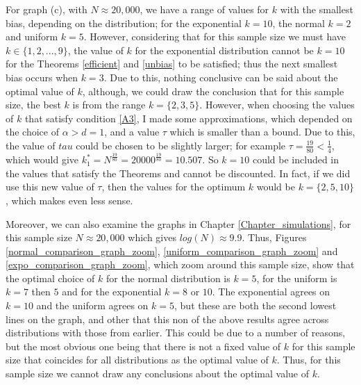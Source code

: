 \documentclass[12pt]{report}
\begin{document}
For graph (c), with $N \approx 20,000$, we have a range of values for $k$ with the smallest bias, depending on the distribution; for the exponential $k=10$, the normal $k=2$ and uniform $k=5$. However, considering that for this sample size we must have $k \in \{1, 2, ..., 9\}$, the value of $k$ for the exponential distribution cannot be $k=10$ for the Theorems \ref{efficient} and \ref{unbias} to be satisfied; thus the next smallest bias occurs when $k=3$. Due to this, nothing conclusive can be said about the optimal value of $k$, although, we could draw the conclusion that for this sample size, the best $k$ is from the range $k = \{2, 3, 5\}$. However, when choosing the values of $k$ that satisfy condition \ref{A3}, I made some approximations, which depended on the choice of $\alpha > d = 1$, and a value $\tau$ which is smaller than a bound. Due to this, the value of $tau$ could be chosen to be slightly larger; for example $\tau = \frac{19}{80} < \frac{1}{4}$, which would give $k_{1}^{*} = N^{\frac{19}{80}} = 20000^{\frac{19}{80}} = 10.507$. So $k=10$ could be included in the values that satisfy the Theorems and cannot be discounted. In fact, if we did use this new value of $\tau$, then the values for the optimum $k$ would be $k = \{2, 5, 10\}$, which makes even less sense.

Moreover, we can also examine the graphs in Chapter \ref{Chapter_simulations}, for this sample size $N \approx 20,000$ which gives $log(N) \approx 9.9$. Thus, Figures \ref{normal_comparison_graph_zoom}, \ref{uniform_comparison_graph_zoom} and \ref{expo_comparison_graph_zoom}, which zoom around this sample size, show that the optimal choice of $k$ for the normal distribution is $k=5$, for the uniform is $k=7$ then $5$ and for the exponential $k=8$ or $10$. The exponential agrees on $k=10$ and the uniform agrees on $k=5$, but these are both the second lowest lines on the graph, and other that this non of the above results agree across distributions with those from earlier. This could be due to a number of reasons, but the most obvious one being that there is not a fixed value of $k$ for this sample size that coincides for all distributions as the optimal value of $k$. Thus, for this sample size we cannot draw any conclusions about the optimal value of $k$.
\end{document}
